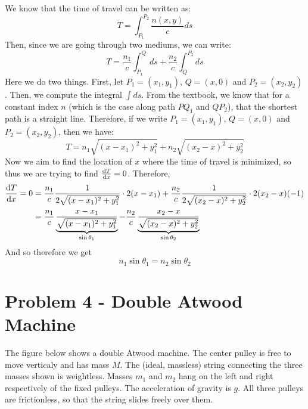 \documentclass[10pt]{article}
\begin{document}
    \begin{solution}
        We know that the time of travel can be written as: 
        \[ T = \int_{P_1}^{P_2} \frac{n(x, y)}{c} ds\] 
        Then, since we are going through two mediums, we can write: 
        \[ T = \frac{n_1}{c} \int_{P_1}^Q ds + \frac{n_2}{c} \int_Q^{P_2} ds\] 
        Here we do two things. First, let $P_1 = (x_1, y_1)$, $Q = (x, 0)$ and $P_2 = (x_2, y_2)$. Then, we compute the integral $\int ds$. From the textbook, we know that for a constant index $n$ (which is the case along path $PQ_1$ and $QP_2$), that the shortest path is a straight line. Therefore, if we write $P_1 = (x_1, y_1)$, $Q = (x, 0)$ and $P_2 = (x_2, y_2)$, then we have:
        \[ T = n_1 \sqrt{(x - x_1)^2 + y_1^2} + n_2 \sqrt{(x_2 - x)^2 + y_2^2}\] 
        Now we aim to find the location of $x$ where the time of travel is minimized, so thus we are trying to find $\dv{T}{x} = 0$. Therefore, 
        \begin{align*}
            \dv{T}{x} = 0 &= \frac{n_1}{c}\frac{1}{2\sqrt{(x - x_1)^2 + y_1^2}} \cdot 2(x - x_1) + \frac{n_2}{c}\frac{1}{2\sqrt{(x_2 - x)^2 + y_2^2}} \cdot 2(x_2 - x) (-1)\\
            &= \frac{n_1}{c} \underbrace{\frac{x - x_1}{\sqrt{(x - x_1)^2 + y_1^2}}}_{\sin \theta_1} - \frac{n_2}{c} \underbrace{\frac{x_2 - x}{\sqrt{(x_2 - x)^2 + y_2^2}}}_{\sin \theta_2}
        \end{align*}
        And so therefore we get
        \[ n_1 \sin \theta_1 = n_2 \sin \theta_2\] 
    \end{solution}

    \pagebreak

    \section*{Problem 4 - Double Atwood Machine}

    The figure below shows a double Atwood machine. The center pulley is free to move verticaly and has mass $M$. The (ideal, massless) string connecting the three masses shown is weightless. Masses $m_1$ and $m_2$ hang on the left and right respectively of the fixed pulleys. The acceleration of gravity is $g$. All three pulleys are frictionless, so that the string slides freely over them. 
\end{document}
